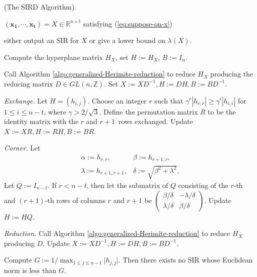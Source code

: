 \documentclass{sig-alternate}
\numberwithin{theorem}{section} \numberwithin{equation}{section}
\begin{document}
\begin{algorithm}[t!]
\caption{(The SIRD Algorithm).}
\begin{algorithmic}[1]
\REQUIRE $(\mathbf{x_1}, \cdots, \mathbf{x_t}) =
X\in\mathbb{R}^{n\times t}$ satisfying (\ref{eq:suppose-on-x})


\ENSURE either output an SIR for $X$ or give a lower bound on
$\lambda(X)$.

 Compute the hyperplane matrix $H_{X}$, set
$H := H_{X}$, $ B := I_n$.

 Call Algorithm
\ref{algo:generalized-Herimite-reduction} to reduce $H_{X}$
producing the reducing matrix $D\in GL(n, \mathbb{Z})$. Set $X :=
XD^{-1}, H := DH,  B := BD^{-1}$.

\LOOP

\STATE\label{algostep:exchange} {\em Exchange.} Let $H = (h_{i,j})$.
Choose an integer $r$ such that $\gamma^{r}|h_{r,r}| \geq
\gamma^{i}|h_{i,i}|$ for $1\leq i\leq n - t$, where $\gamma >
2/\sqrt{3}$. Define the permutation matrix $R$ to be the identity
matrix with the $r$ and $r+1$~rows exchanged. Update $X := XR, H :=
RH,  B := BR$.


\STATE\label{algostep:corner} {\em Corner.} Let
\begin{equation}\label{eq:alph-beta-lambda-delta}
\begin{array}{ll}
  \alpha := h_{r,r}, & \beta := h_{r+1,r}, \\
  \lambda := h_{r+1, r+1}, & \delta := \sqrt{\beta^2 +
\lambda^2}.
\end{array}
\end{equation} Let $Q := I_{n-t}$. If
$r < n - t$,
 then let the submatrix of $Q$ consisting of the $r$-th and
$(r + 1)$-th rows of columns $r$ and $r + 1$ be
$\left (\begin{matrix} \beta/\delta & -\lambda/\delta\\
\lambda/\delta&\beta/\delta
\end{matrix}
\right )$.
Update $H := HQ$.


\STATE\label{algostep:reduction} {\em Reduction.} Call Algorithm
\ref{algo:generalized-Herimite-reduction} to reduce $H_{X}$
producing $D$. Update $X := XD^{-1}, H := DH,  B := BD^{-1}$.

\STATE Compute $G := 1/\max_{1\leq j\leq n-t}\lvert h_{j,j}\rvert$.
Then there  exists no SIR whose Euclidean norm is less than $G$.
\label{algostep:bound-of-possible-relations}





\ENDLOOP
\end{algorithmic}\label{algo:Simultaneous-relation}
\end{algorithm}
\end{document}
